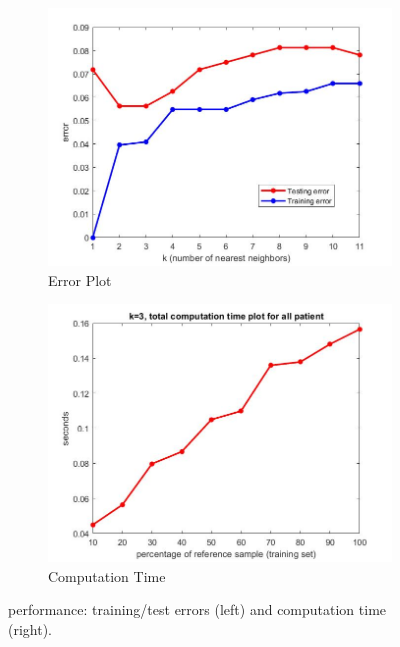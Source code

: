 \begin{figure}
	\centering
	\begin{subfigure}{.37\textwidth}
		\centering
		\includegraphics[width=.9\linewidth]{figures/knnerror.jpg}
		\caption{Error Plot}
		\label{fig:knnerror}
	\end{subfigure}%
	\begin{subfigure}{.37\textwidth}
		\centering
		\includegraphics[width=.9\linewidth]{figures/kNNpercentage.jpg}
		\caption{Computation Time}
		\label{fig:knncomp}
	\end{subfigure}
	\caption{\knn{} performance: training/test errors (left) and 
	computation time (right).}
	\label{fig:knn}
\end{figure}


